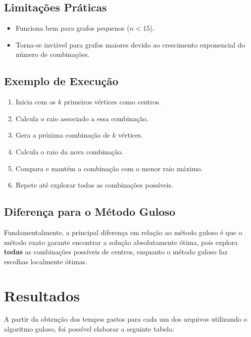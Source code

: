 \documentclass[10pt,conference]{IEEEtran}
\begin{document}
\subsection{Limitações Práticas}
\begin{itemize}
    \item Funciona bem para grafos pequenos (\(n < 15\)).
    \item Torna-se inviável para grafos maiores devido ao crescimento exponencial do número de combinações.
\end{itemize}

\subsection{Exemplo de Execução}
\begin{enumerate}
    \item Inicia com os \(k\) primeiros vértices como centros.
    \item Calcula o raio associado a essa combinação.
    \item Gera a próxima combinação de \(k\) vértices.
    \item Calcula o raio da nova combinação.
    \item Compara e mantém a combinação com o menor raio máximo.
    \item Repete até explorar todas as combinações possíveis.
\end{enumerate}

\subsection*{Diferença para o Método Guloso}
Fundamentalmente, a principal diferença em relação ao método guloso é que o método exato garante encontrar a solução absolutamente ótima, pois explora \textbf{todas} as combinações possíveis de centros, enquanto o método guloso faz escolhas localmente ótimas.

\section{Resultados}
A partir da obtenção dos tempos gastos para cada um dos arquivos utilizando o algoritmo guloso, foi possível elaborar a seguinte tabela:
\end{document}

